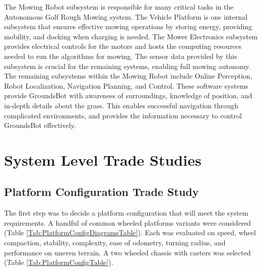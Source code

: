 \documentclass[12pt]{extarticle}
\begin{document}
\newpage
  The Mowing Robot subsystem is responsible for many critical tasks in the Autonomous Golf Rough Mowing system. The Vehicle Platform is one internal subsystem that ensures effective mowing operations by storing energy, providing mobility, and docking when charging is needed. The Mower Electronics subsystem provides electrical controls for the motors and hosts the computing resources needed to run the algorithms for mowing. The sensor data provided by this subsystem is crucial for the remaining systems, enabling full mowing autonomy.\\
  
  The remaining subsystems within the Mowing Robot include Online Perception, Robot Localization, Navigation Planning, and Control. These software systems provide GroundsBot with awareness of surroundings, knowledge of position, and in-depth details about the grass. This enables successful navigation through complicated environments, and provides the information necessary to control GroundsBot effectively.\\

\newpage
\section{System Level Trade Studies}
  \subsection{Platform Configuration Trade Study}
The first step was to decide a platform configuration that will meet the system requirements. A handful of common wheeled platforms \cite{husky} variants were considered (Table \ref{Tab:PlatformConfigDiagramsTable}). Each was evaluated on speed, wheel compaction, stability, complexity, ease of odometry, turning radius, and performance on uneven terrain. A two wheeled chassis with casters was selected (Table \ref{Tab:PlatformConfigTable}).
\end{document}
